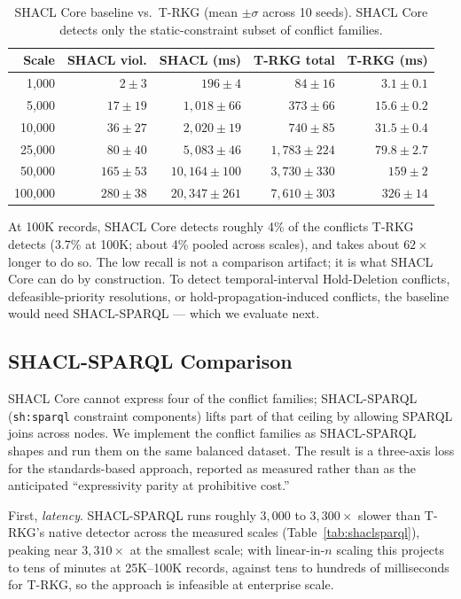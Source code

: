 \documentclass{ieeeaccess}
\begin{document}
\begin{table}[t]
\centering
\caption{SHACL Core baseline vs.\ T-RKG (mean $\pm \sigma$ across 10 seeds). SHACL Core detects only the static-constraint subset of conflict families.}
\label{tab:shacl}
\begin{tabular}{rrrrr}
\hline\hline
Scale & SHACL viol. & SHACL (ms) & T-RKG total & T-RKG (ms) \\
\hline
1{,}000   & $2 \pm 3$    & $196 \pm 4$       & $84 \pm 16$       & $3.1 \pm 0.1$ \\
5{,}000   & $17 \pm 19$  & $1{,}018 \pm 66$  & $373 \pm 66$      & $15.6 \pm 0.2$ \\
10{,}000  & $36 \pm 27$  & $2{,}020 \pm 19$  & $740 \pm 85$      & $31.5 \pm 0.4$ \\
25{,}000  & $80 \pm 40$  & $5{,}083 \pm 46$  & $1{,}783 \pm 224$ & $79.8 \pm 2.7$ \\
50{,}000  & $165 \pm 53$ & $10{,}164 \pm 100$ & $3{,}730 \pm 330$ & $159 \pm 2$ \\
100{,}000 & $280 \pm 38$ & $20{,}347 \pm 261$ & $7{,}610 \pm 303$ & $326 \pm 14$ \\
\hline\hline
\end{tabular}
\end{table}

At 100K records, SHACL Core detects roughly 4\% of the conflicts T-RKG detects (3.7\% at 100K; about 4\% pooled across scales), and takes about $62\times$ longer to do so. The low recall is not a comparison artifact; it is what SHACL Core can do by construction. To detect temporal-interval Hold-Deletion conflicts, defeasible-priority resolutions, or hold-propagation-induced conflicts, the baseline would need SHACL-SPARQL --- which we evaluate next.

\subsection{SHACL-SPARQL Comparison}
\label{sec:shaclsparql}

SHACL Core cannot express four of the conflict families; SHACL-SPARQL (\texttt{sh:sparql} constraint components) lifts part of that ceiling by allowing SPARQL joins across nodes. We implement the conflict families as SHACL-SPARQL shapes and run them on the same balanced dataset. The result is a three-axis loss for the standards-based approach, reported as measured rather than as the anticipated ``expressivity parity at prohibitive cost.''

First, \emph{latency}. SHACL-SPARQL runs roughly $3{,}000$ to $3{,}300\times$ slower than T-RKG's native detector across the measured scales (Table~\ref{tab:shaclsparql}), peaking near $3{,}310\times$ at the smallest scale; with linear-in-$n$ scaling this projects to tens of minutes at 25K--100K records, against tens to hundreds of milliseconds for T-RKG, so the approach is infeasible at enterprise scale.
\end{document}
